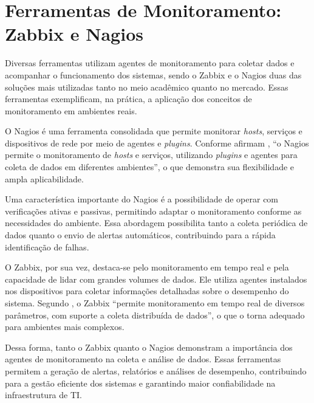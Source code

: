 \documentclass[
    12pt
    ,oneside
    ,a4paper
    ,chapter=TITLE
    ,section=TITLE
    ,sumario=abnt-6027-2012]{abntex2}
\begin{document}
\section{Ferramentas de Monitoramento: Zabbix e Nagios}

Diversas ferramentas utilizam agentes de monitoramento para coletar dados e acompanhar o funcionamento dos sistemas, sendo o Zabbix e o Nagios duas das soluções mais utilizadas tanto no meio acadêmico quanto no mercado. Essas ferramentas exemplificam, na prática, a aplicação dos conceitos de monitoramento em ambientes reais.

O Nagios é uma ferramenta consolidada que permite monitorar \textit{hosts}, serviços e dispositivos de rede por meio de agentes e \textit{plugins}. Conforme afirmam , “o Nagios permite o monitoramento de \textit{hosts} e serviços, utilizando \textit{plugins} e agentes para coleta de dados em diferentes ambientes”, o que demonstra sua flexibilidade e ampla aplicabilidade.

Uma característica importante do Nagios é a possibilidade de operar com verificações ativas e passivas, permitindo adaptar o monitoramento conforme as necessidades do ambiente. Essa abordagem possibilita tanto a coleta periódica de dados quanto o envio de alertas automáticos, contribuindo para a rápida identificação de falhas.

O Zabbix, por sua vez, destaca-se pelo monitoramento em tempo real e pela capacidade de lidar com grandes volumes de dados. Ele utiliza agentes instalados nos dispositivos para coletar informações detalhadas sobre o desempenho do sistema. Segundo , o Zabbix “permite monitoramento em tempo real de diversos parâmetros, com suporte a coleta distribuída de dados”, o que o torna adequado para ambientes mais complexos.

Dessa forma, tanto o Zabbix quanto o Nagios demonstram a importância dos agentes de monitoramento na coleta e análise de dados. Essas ferramentas permitem a geração de alertas, relatórios e análises de desempenho, contribuindo para a gestão eficiente dos sistemas e garantindo maior confiabilidade na infraestrutura de TI.

\end{document}
